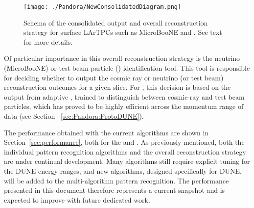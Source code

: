 \begin{figure}[!h!tbp]
\centering
\texttt{[image: ./Pandora/NewConsolidatedDiagram.png]}
\caption[Schema of the  consolidated output and overall reconstruction strategy for surface LArTPCs]{Schema of the  consolidated output and overall reconstruction strategy for surface LArTPCs such as MicroBooNE and . See text for more details.}
\label{consolidated_reco}
\end{figure}

Of particular importance in this overall reconstruction strategy is the neutrino (MicroBooNE) or test beam particle () identification tool. This tool is responsible for deciding whether to output the cosmic ray or neutrino (or test beam) reconstruction outcomes for a given slice. For , this decision is based on the output from adaptive , trained to distinguish between cosmic-ray and test beam particles, which has proved to be highly efficient across the momentum range of  data (see Section ~\ref{sec:Pandora:ProtoDUNE}). %


The performance obtained with the current algorithms are shown in Section~\ref{sec:performance}, both for the  and .  As previously mentioned, both the individual pattern recognition algorithms and the overall reconstruction strategy are under continual development. Many algorithms %
still require explicit tuning for the DUNE energy ranges, and new algorithms, designed specifically for DUNE, will be added to the multi-algorithm pattern recognition. The performance presented in this document therefore represents a current snapshot and is expected to improve with future dedicated work. 


